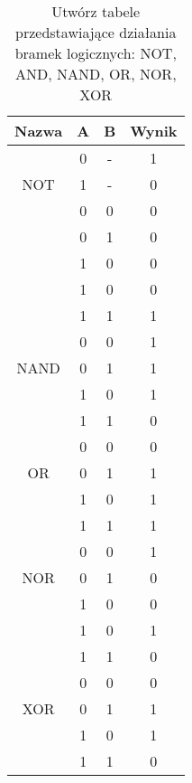 \documentclass[a4paper]{article}
\begin{document}
\begin{table}[h]
\centering\caption{Utwórz tabele przedstawiające działania bramek logicznych: NOT, AND, NAND, OR, NOR, XOR}
\begin{center}
\begin{tabular}{c|c|c|c}
\hline
Nazwa & A & B & Wynik \\
\hline
\multirow{3}{4em}{NOT}& 0 & - &1  \\
& 1 & -& 0 \\

\hline
\multirow{3}{4em}{AND}& 0 & 0 &0  \\
& 0 & 1& 0 \\
& 1 & 0& 0 \\
& 1 & 0& 0 \\
& 1 & 1& 1 \\
\hline
\multirow{3}{4em}{NAND}& 0 & 0 &1  \\
& 0 & 1& 1 \\
& 1 & 0& 1 \\
& 1 & 1& 0 \\
\hline
\multirow{3}{4em}{OR}& 0 & 0 &0  \\
& 0 & 1& 1 \\
& 1 & 0& 1 \\
& 1 & 1& 1 \\
\hline
\multirow{3}{4em}{NOR}& 0 & 0 &1  \\
& 0 & 1& 0 \\
& 1 & 0& 0 \\
& 1 & 0& 1 \\
& 1 & 1& 0 \\
\hline
\multirow{3}{4em}{XOR}& 0 & 0 &0  \\
& 0 & 1& 1 \\
& 1 & 0& 1 \\
& 1 & 1& 0 \\
\hline
\end{tabular}
\end{center}
\end{table}
\end{document}
